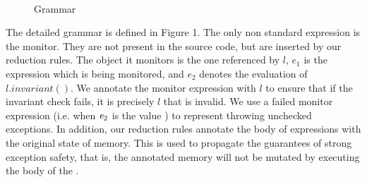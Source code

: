 \begin{figure}
\begin{grammatica}
\\
\\
\\
\\
\\
\\
\end{grammatica}
\caption{Grammar}
\end{figure}


The detailed grammar is defined in Figure 1.
The only non standard expression is the monitor. They are not present in the source code, but are inserted by our reduction rules. The object it monitors is the one referenced by $l$, $e_1$ is the expression which is being monitored, and $e_2$ denotes the evaluation of $l.invariant()$.
We annotate the monitor expression with $l$ to ensure
that if the invariant check fails, it is precisely $l$ that is invalid.
We use a failed monitor expression (i.e. when ${\mathit{e}}_2$ is the value \Q@false@) to represent throwing unchecked exceptions.
In addition, our reduction rules annotate the body of \Q@try@ expressions with
the original state of memory. This is used to propagate the guarantees of strong exception safety,
that is, the annotated memory will not be mutated by executing the body of the \Q@try@.


